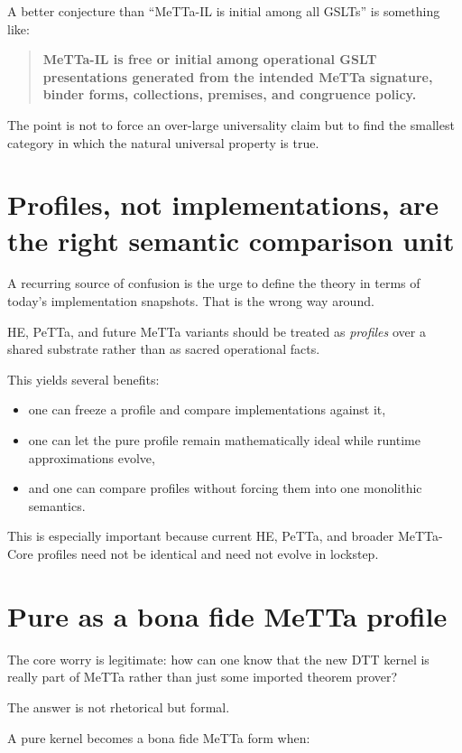 \documentclass[11pt]{article}
\begin{document}
A better conjecture than ``MeTTa-IL is initial among all GSLTs'' is something like:

\begin{quote}
\textbf{MeTTa-IL is free or initial among operational GSLT presentations generated from the intended MeTTa signature, binder forms, collections, premises, and congruence policy.}
\end{quote}

The point is not to force an over-large universality claim but to find the smallest category in which the natural universal property is true.

\section{Profiles, not implementations, are the right semantic comparison unit}

A recurring source of confusion is the urge to define the theory in terms of today's implementation snapshots. That is the wrong way around.

HE, PeTTa, and future MeTTa variants should be treated as \emph{profiles} over a shared substrate rather than as sacred operational facts.

This yields several benefits:

\begin{itemize}
  \item one can freeze a profile and compare implementations against it,
  \item one can let the pure profile remain mathematically ideal while runtime approximations evolve,
  \item and one can compare profiles without forcing them into one monolithic semantics.
\end{itemize}

This is especially important because current HE, PeTTa, and broader MeTTa-Core profiles need not be identical and need not evolve in lockstep.

\section{Pure as a bona fide MeTTa profile}

The core worry is legitimate: how can one know that the new DTT kernel is really part of MeTTa rather than just some imported theorem prover?

The answer is not rhetorical but formal.

A pure kernel becomes a bona fide MeTTa form when:
\end{document}
